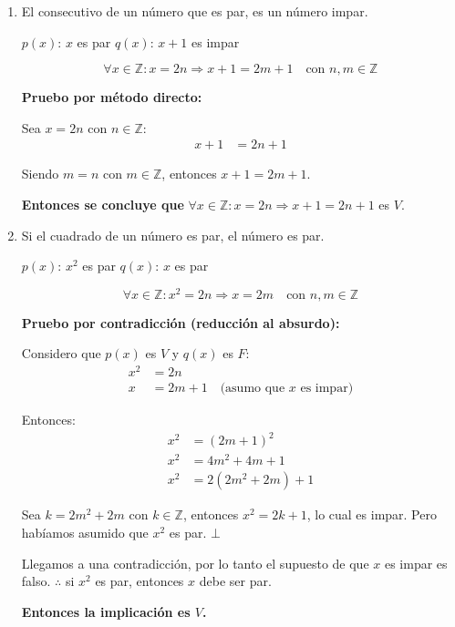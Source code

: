 \documentclass[12pt]{article}
\begin{document}
\begin{enumerate}[label=\alph*.-]
    $\therefore$ encontramos un caso donde la suma es par pero los sumandos no son impares. \textbf{La implicación es $F$.}

    \newpage

    \item El consecutivo de un número que es par, es un número impar.

    $p(x)$: $x$ es par \quad $q(x)$: $x+1$ es impar

    \[\forall x \in \mathbb{Z}: x = 2n \Rightarrow x+1 = 2m+1 \quad \text{con } n,m \in \mathbb{Z}\]

    \textbf{Pruebo por método directo:}

    Sea $x = 2n$ con $n \in \mathbb{Z}$:
    \begin{align*}
        x + 1 &= 2n + 1
    \end{align*}

    Siendo $m = n$ con $m \in \mathbb{Z}$, entonces $x + 1 = 2m + 1$.

    \textbf{Entonces se concluye que} $\forall x \in \mathbb{Z}: x = 2n \Rightarrow x+1 = 2n+1$ es $V$.

    \item Si el cuadrado de un número es par, el número es par.

    $p(x)$: $x^2$ es par \quad $q(x)$: $x$ es par

    \[\forall x \in \mathbb{Z}: x^2 = 2n \Rightarrow x = 2m \quad \text{con } n,m \in \mathbb{Z}\]

    \textbf{Pruebo por contradicción (reducción al absurdo):}

    Considero que $p(x)$ es $V$ y $q(x)$ es $F$:
    \begin{align*}
        x^2 &= 2n \\
        x &= 2m + 1 \quad \text{(asumo que $x$ es impar)}
    \end{align*}

    Entonces:
    \begin{align*}
        x^2 &= (2m+1)^2 \\
        x^2 &= 4m^2 + 4m + 1 \\
        x^2 &= 2(2m^2 + 2m) + 1
    \end{align*}

    Sea $k = 2m^2 + 2m$ con $k \in \mathbb{Z}$, entonces $x^2 = 2k + 1$, lo cual es impar. Pero habíamos asumido que $x^2$ es par. $\bot$

    Llegamos a una contradicción, por lo tanto el supuesto de que $x$ es impar es falso. $\therefore$ si $x^2$ es par, entonces $x$ debe ser par.

    \textbf{Entonces la implicación es $V$.}

\end{enumerate}
\end{document}

